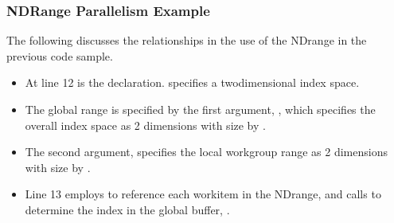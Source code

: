 \documentclass[letterpaper,10pt,english]{sphinxmanual}
\begin{document}
\begin{sphinxVerbatim}[commandchars=\\\{\}]
    
        
          
     \PYG{p}{[}\PYG{p}{]}\PYG{p}{[}\PYG{p}{]}
  
\end{sphinxVerbatim}
\subsubsection*{ND\sphinxhyphen{}Range Parallelism Example}

The following discusses the relationships in the use of the ND\sphinxhyphen{}range
in the previous code sample.
\begin{itemize}
\item {} 
At line 12 is the  declaration. 
specifies a two\sphinxhyphen{}dimensional index space.

\item {} 
The global range is specified by the first argument,
, which specifies the overall index space as 2
dimensions with size  by .

\item {} 
The second argument,  specifies the local
work\sphinxhyphen{}group range as 2 dimensions with size  by .

\item {} 
Line 13 employs  to reference each work\sphinxhyphen{}item in the
ND\sphinxhyphen{}range, and calls  to determine the index in
the global buffer, .

\end{itemize}
\end{document}
